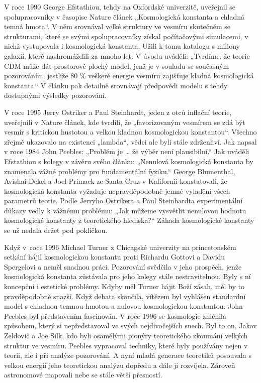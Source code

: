   V roce 1990 George Efstathiou, tehdy na Oxfordské univerzitě, uveřejnil se spolupracovníky v
  časopise Nature článek „Kosmologická konstanta a chladná temná hmota“. V něm srovnával velké
  struktury ve vesmíru skutečném se strukturami, které se svými spolupracovníky získal počítačovými
  simulacemi, v nichž vystupovala i kosmologická konstanta. Užili k tomu katalogu s miliony galaxií,
  které nashromáždili za mnoho let. V úvodu uváděli: „Tvrdíme, že teorie CDM může dát prostorově
  plochý model, jenž je v souladu se současným pozorováním, jestliže 80 \% veškeré energie vesmíru
  zajišťuje kladná kosmologická konstanta.“ V článku pak detailně srovnávají předpovědi modelu s
  tehdy dostupnými výsledky pozorování. 
  
  V roce 1995 Jerry Ostriker a Paul Steinhardt, jeden z otců inflační teorie, uveřejnili v Nature
  článek, kde tvrdili, že „favorizovaným vesmírem se zdá být vesmír s kritickou hustotou a velkou
  kladnou kosmologickou konstantou“. Všechno zřejmě ukazovalo na existenci „lambda“, vědci ale byli
  stále zdrženliví. Jak napsal v roce 1984 John Peebles: „Problém je … že výběr není plausibilní.“
  Jak uváděli Efstathiou s kolegy v závěru svého článku: „Nenulová kosmologická konstanta by
  znamenala vážné problémy pro fundamentální fyziku.“ George Blumenthal, Avishai Dekel a Joel
  Primack ze Santa Cruz v Kalifornii konstatovali, že kosmologická konstanta vyžaduje
  nepravděpodobně jemné vyladění všech parametrů teorie. Podle Jerryho Ostrikera a Paul Steinhardta
  experimentální důkazy vedly k vážnému problému: „Jak můžeme vysvětlit nenulovou hodnotu
  kosmologické konstanty z teoretického hlediska?“ Záhada kosmologické konstanty se už nedala držet
  pod pokličkou. 
  
  Když v roce 1996 Michael Turner z Chicagské univerzity na princetonském setkání hájil
  kosmologickou konstantu proti Richardu Gottovi a Davidu Spergelovi a neměl snadnou práci.
  Pozorování svědčila v jeho prospěch, jenže kosmologická konstanta zůstávala pro jeho kolegy stále
  nestravitelnou. Byly s ní koncepční i estetické problémy. Kdyby měl Turner hájit Boží zásah, měl
  by to pravděpodobně snazší. Když debata skončila, vítězem byl vyhlášen standardní model s chladnou
  temnou hmotou a nulovou kosmologickou konstantou. John Peebles byl představením fascinován. V roce
  1996 se kosmologie změnila způsobem, který si nepředstavoval ve svých nejdivočejších snech. Byl to
  on, Jakov Zeldovič a Joe Silk, kdo byli osamělými pionýry teoretického zkoumání velkých struktur
  ve vesmíru. Peebles vypracoval techniky, které byly používány nejen v teorii, ale i při analýze
  pozorování. A nyní mladá generace teoretiků posouvala s velkou energií jeho teoretickou analýzu
  dopředu a dále ji rozvíjela. Zároveň astronomové mapovali nebe se stále větší přesností. 
  

